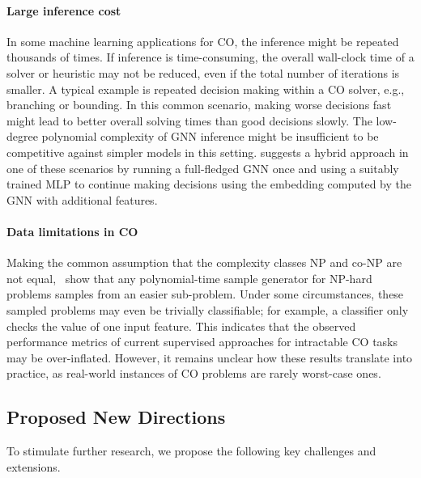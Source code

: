 \documentclass[twoside,11pt]{article}
\newcommand{\cm}[1]{{{\textcolor{orange}{\textbf{[CM:} {#1}\textbf{]}}}}}
\begin{document}
\paragraph{Large inference cost}
In some machine learning applications for CO, the inference might be repeated thousands of times. If inference is time-consuming, the overall wall-clock time of a solver or heuristic may not be reduced, even if the total number of iterations is smaller. A typical example is repeated decision making within a CO solver, e.g., branching or bounding. In this common scenario, making worse decisions fast might lead to better overall solving times than good decisions slowly. The low-degree polynomial complexity of GNN inference might be insufficient to be competitive against simpler models in this setting. \citet{Gupta2020} suggests a hybrid approach in one of these scenarios by running a full-fledged GNN once and using a suitably trained MLP to continue making decisions using the embedding computed by the GNN with additional features.

\paragraph{Data limitations in CO}
Making the common assumption that the complexity classes \textsf{NP} and \textsf{co-NP} are not equal,~\citet{Yehuda2020} show that any polynomial-time sample generator for \textsf{NP}-hard problems samples from an easier sub-problem. Under some circumstances, these sampled problems may even be trivially classifiable; for example, a classifier only checks the value of one input feature. This indicates that the observed performance metrics of current supervised approaches for intractable CO tasks may be over-inflated.  However, it remains unclear how these results translate into practice, as real-world instances of CO problems are rarely worst-case ones.

\subsection{Proposed New Directions}%

To stimulate further research, we propose the following key challenges and extensions.
\end{document}
